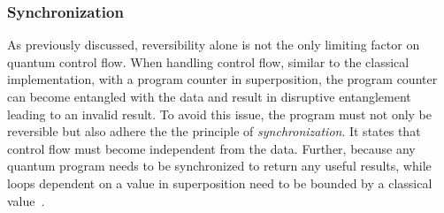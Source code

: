 \subsubsection{Synchronization}
\label{sec:background_controlflow_synchronization}
As previously discussed, reversibility alone is not the only limiting factor on quantum control flow. When handling control flow, similar to the classical implementation, with a program counter in superposition, the program counter can become entangled with the data and result in disruptive entanglement leading to an invalid result. To avoid this issue, the program must not only be reversible but also adhere the the principle of \emph{synchronization}. It states that control flow must become independent from the data. Further, because any quantum program needs to be synchronized to return any useful results, while loops dependent on a value in superposition need to be bounded by a classical value~\cite{YVC24}.  